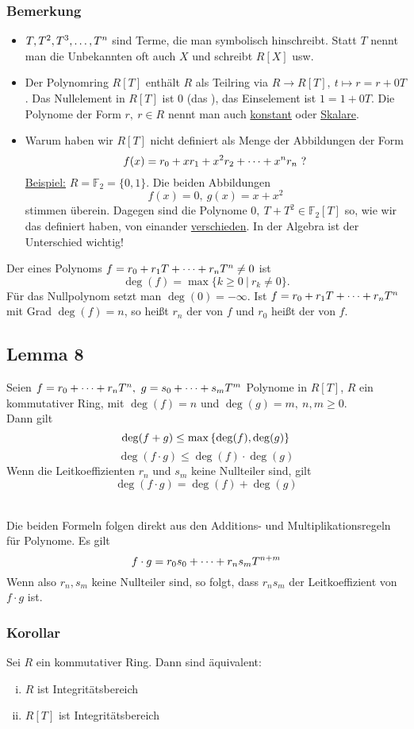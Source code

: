 \subsubsection*{Bemerkung}
\begin{itemize}
	\item $T,T^2,T^3, \dots ,T^n$ sind Terme, die man symbolisch hinschreibt.
	Statt $T$ nennt man die Unbekannten oft auch $X$ und schreibt $R[X]$ usw.
	\item Der Polynomring $R[T]$ enthält $R$ als Teilring via $R\to R[T],~t\mapsto r=r+0T$.
	Das Nullelement in $R[T]$ ist 0 (das ), das Einselement ist $1=1+0T$.
	Die Polynome der Form $r,~r\in R$ nennt man auch \uline{konstant} oder \uline{Skalare}.
	\item Warum haben wir $R[T]$ nicht definiert als Menge der Abbildungen der Form
	\[
	f(x)=r_0+xr_1+x^2r_2+ \dots +x^nr_n~?
	\]
	\uline{Beispiel:} $R=\mathds{F}_2=\{0,1\}$.
	Die beiden Abbildungen
	\[
	f(x)=0,~g(x)=x+x^2
	\]
	stimmen überein.
	Dagegen sind die Polynome $0,~T+T^2\in\mathds{F}_2[T]$ so, wie wir das definiert haben, von einander \uline{verschieden}.
	In der Algebra ist der Unterschied wichtig!
\end{itemize}
Der  eines Polynoms $f=r_0+r_1T+ \dots + r_nT^n\neq 0$ ist
\[
\deg(f)=\max\{k\ge 0~|~r_k\neq 0\}.
\]
Für das Nullpolynom setzt man $\deg(0)=-\infty$.
Ist $f=r_0+r_1T+ \dots +r_nT^n$ mit Grad $\deg(f)=n$, so heißt $r_n$ der  von $f$ und $r_0$ heißt der  von $f$.

\subsection{Lemma 8}
\label{sub:lemma_8}
Seien $f=r_0+ \dots +r_nT^n,~g=s_0+ \dots +s_mT^m$ Polynome in $R[T]$, $R$ ein kommutativer Ring, mit $\deg(f)=n$ und $\deg(g)=m,~n,m\ge 0$.\\
Dann gilt
\[
\deg(f+g)\le \max\left\{\deg(f),\deg(g)\right\}
\]
\[
\deg(f\cdot g)\le \deg(f)\cdot\deg(g)
\]
Wenn die Leitkoeffizienten $r_n$ und $s_m$ keine Nullteiler sind, gilt
\[
\deg(f \cdot g)=\deg(f)+\deg(g)
\]

\\
Die beiden Formeln folgen direkt aus den Additions- und Multiplikationsregeln für Polynome.
Es gilt
\[
f\cdot g=r_0s_0+ \dots +r_ns_mT^{n+m}
\]
Wenn also $r_n,s_m$ keine Nullteiler sind, so folgt, dass $r_ns_m$ der Leitkoeffizient von $f\cdot g$ ist.

\subsubsection*{Korollar}
Sei $R$ ein kommutativer Ring.
Dann sind äquivalent:
\begin{enumerate}[(i)]
	\item $R$ ist Integritätsbereich
	\item $R[T]$ ist Integritätsbereich
\end{enumerate}

